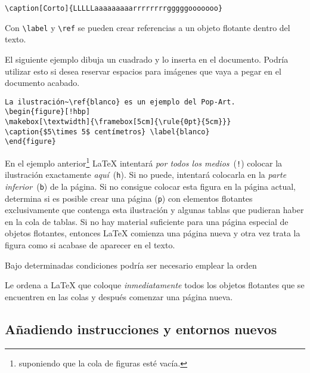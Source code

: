 \begin{code}
\verb|\caption[Corto]{LLLLLaaaaaaaaarrrrrrrrgggggooooooo}| 
\end{code}

Con  \verb|\label| y  \verb|\ref|  se pueden  crear  referencias a  un
objeto flotante dentro del texto.

El siguiente ejemplo dibuja un cuadrado  y lo inserta en el documento.
Podría utilizar esto si desea reservar espacios para imágenes que vaya
a pegar en el documento acabado.

\begin{code}
\begin{verbatim}
La ilustración~\ref{blanco} es un ejemplo del Pop-Art.
\begin{figure}[!hbp]
\makebox[\textwidth]{\framebox[5cm]{\rule{0pt}{5cm}}}
\caption{$5\times 5$ centímetros} \label{blanco}
\end{figure}
\end{verbatim}
\end{code}

\noindent   En   el   ejemplo  anterior\footnote{suponiendo   que   la
cola   de   figuras   esté  vacía.}   \LaTeX{}   intentará   \emph{por
todos  los  medios}~(\texttt{!})  colocar la  ilustración  exactamente
\emph{aquí}~(\texttt{h}).  Si  no  puede, intentará  colocarla  en  la
\emph{parte  inferior}~(\texttt{b})  de  la  página.  Si  no  consigue
colocar esta figura en la página actual, determina si es posible crear
una  página  (\verb|p|)  con elementos  flotantes  exclusivamente  que
contenga esta  ilustración y algunas  tablas que pudieran haber  en la
cola de tablas. Si no hay material suficiente para una página especial
de objetos  flotantes, entonces \LaTeX{}  comienza una página  nueva y
otra vez trata la figura como si acabase de aparecer en el texto.

Bajo determinadas condiciones podría ser necesario emplear la orden
\begin{command}
\end{command}

\noindent Le ordena a \LaTeX{} que coloque \emph{inmediatamente} todos
los  objetos  flotantes que  se  encuentren  en  las colas  y  después
comenzar una página nueva.



\subsection{Añadiendo instrucciones y entornos nuevos}

